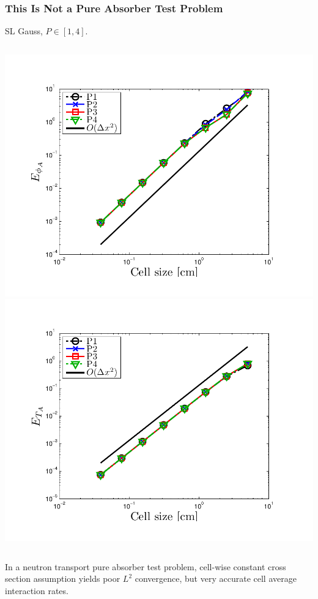 \documentclass{beamer}
\begin{document}
\begin{frame}
\frametitle{This Is Not a Pure Absorber Test Problem}
SL Gauss, $P\in[1,4]$.  
\begin{columns}[t]
\centering
\includegraphics[width=\textwidth,trim=0.25in  0.2in 0.75in 0.5in,clip=true]{../chapter6_grey_radtran/Dissertation_Data/MMS3_Constant_XS_SL_Gauss_phi_A.pdf}
\centering
\includegraphics[width=\textwidth,trim=0.25in  0.2in 0.75in 0.5in,clip=true]{../chapter6_grey_radtran/Dissertation_Data/MMS3_Constant_XS_SL_Gauss_temp_A.pdf}
\end{columns}
In a neutron transport pure absorber test problem, cell-wise constant cross section assumption yields poor $L^2$ convergence, but very accurate cell average interaction rates. 
\end{frame}
\end{document}
